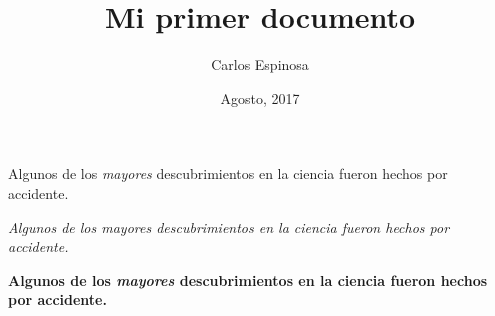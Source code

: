 \documentclass[12pt, letterpaper, twoside]{article}
\title{Mi primer documento}
\author{Carlos Espinosa}
\date{Agosto, 2017}
\begin{document}
 
\maketitle
 
Algunos de los \emph{mayores}
descubrimientos en la ciencia
fueron hechos por accidente.

\textit{Algunos de los \emph{mayores}
descubrimientos en la ciencia
fueron hechos por accidente.}

\textbf{Algunos de los \emph{mayores}
descubrimientos en la ciencia
fueron hechos por accidente.}
\end{document}
